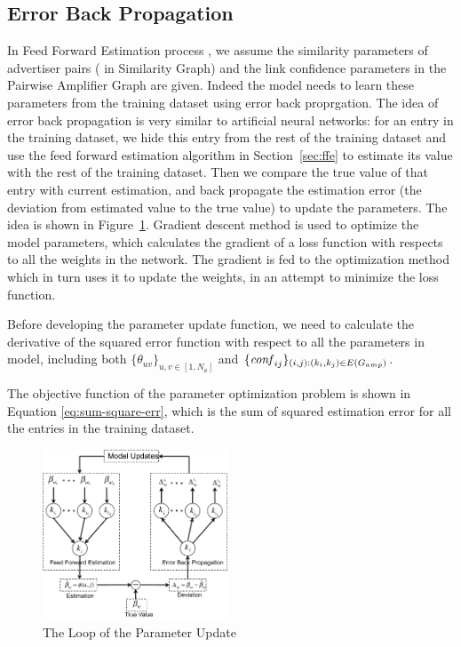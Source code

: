 \subsection{Error Back Propagation}
\label{sec:bp}

In Feed Forward Estimation process , we assume the similarity
parameters of advertiser pairs ( in Similarity Graph) and the link
confidence parameters in the Pairwise Amplifier Graph are
given. Indeed the model needs to learn these parameters from the
training dataset using error back proprgation.  The idea of error back
propagation is very similar to artificial neural networks: for an
entry in the training dataset, we hide this entry from the rest of the
training dataset and use the feed forward estimation algorithm in
Section~\ref{sec:ffe} to estimate its value with the rest of the
training dataset. Then we compare the true value of that entry with
current estimation, and back propagate the estimation error (the
deviation from estimated value to the true value) to update the
parameters.  The idea is shown in
Figure~\ref{fig:trainer-train-entry}.  Gradient descent method
\cite{?} is used to optimize the model parameters, which calculates
the gradient of a loss function with respects to all the weights in
the network. The gradient is fed to the optimization method which in
turn uses it to update the weights, in an attempt to minimize the loss
function.

Before developing the parameter update function, we need to calculate
the derivative of the squared error function with respect to all the
parameters in {\sppan} model, including both
$\{\theta_{uv}\}_{u,v\in[1,N_a]}$ and
$\{\mathit{conf}_{ij}\}_{(i,j):(k_i,k_j)\in E(G_{amp})}$.

The objective function of the parameter optimization problem is shown
in Equation \ref{eq:sum-square-err}, which is the sum of squared
estimation error for all the entries in the training dataset.

\begin{figure}[!ht]
  \centering
  \includegraphics[width=0.49\textwidth]{figures/trainer_train_entry.pdf}
  \caption{The Loop of the Parameter Update}
  \label{fig:trainer-train-entry}
\end{figure}

